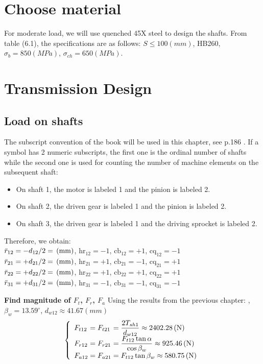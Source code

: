 \section{Choose material}
For moderate load, we will use quenched 45X steel to design the shafts. From table (6.1), the specifications are as follows: $ S \leq 100\unit{(mm)} $, HB260, $ \sigma_b = 850\unit{(MPa)}$, $ \sigma_{ch} = 650\unit{(MPa)}$. 

\section{Transmission Design}
\subsection{Load on shafts}
The subscript convention of the book will be used in this chapter, see p.186 \cite{tk1}. If a symbol has 2 numeric subscripts, the first one is the ordinal number of shafts while the second one is used for counting the number of machine elements on the subsequent shaft:
\begin{itemize}
	\item On shaft 1, the motor is labeled 1 and the pinion is labeled 2.
	\item On shaft 2, the driven gear is labeled 1 and the pinion is labeled 2.
	\item On shaft 3, the driven gear is labeled 1 and the driving sprocket is labeled 2.
\end{itemize}
Therefore, we obtain:\\
$ \bar{r}_{12} = -d_{12}/2 =  \, (\mathrm{mm}) $, $ \text{hr}_{12} = -1 $, $ \text{cb}_{12} = +1$, $ \text{cq}_{12} = -1$\\
$ \bar{r}_{21} = +d_{21}/2 =  \, (\mathrm{mm}) $, $ \text{hr}_{21} = +1 $, $ \text{cb}_{21} = -1$, $ \text{cq}_{21} = +1$\\
$ \bar{r}_{22} = +d_{22}/2 =  \, (\mathrm{mm}) $, $ \text{hr}_{22} = +1 $, $ \text{cb}_{22} = +1$, $ \text{cq}_{22} = +1$\\
$ \bar{r}_{31} = +d_{31}/2 =  \, (\mathrm{mm}) $, $ \text{hr}_{31} = -1 $, $ \text{cb}_{31} = -1$, $ \text{cq}_{31} = -1$

\textbf{Find magnitude of $ F_{t} $, $ F_r $, $ F_a $}
Using the results from the previous chapter: , $ \beta_w = 13.59^\circ $, $ d_{w12}\approx 41.67\unit{(mm)} $
\[
\left\{ 
\begin{array}{l@{{}={}}l@{{}={}}l}
F_{t12}& F_{t21}& \dfrac{2T_{sh1}}{d_{w12}}\approx 2402.28\unit{(N)}\\
F_{r12}& F_{r21}&  \dfrac{F_{t12}\tan\alpha}{\cos\beta_w}\approx 925.46 \unit{(N)}\\
F_{a12}& F_{a21}& F_{t12}\tan\beta_w\approx 580.75 \unit{(N)}\\ 
\end{array}
\right.
\]
